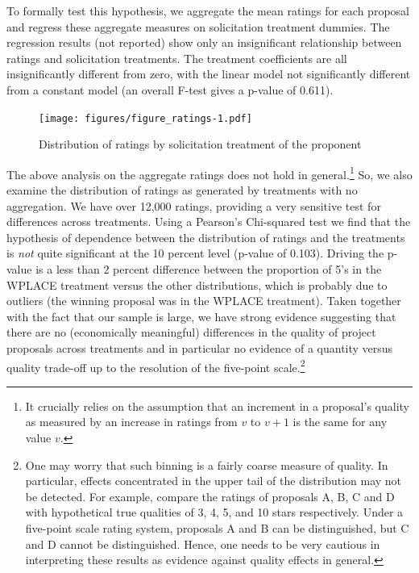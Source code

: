 \documentclass[12pt, titlepage]{article}
\begin{document}
To formally test this hypothesis, we aggregate the mean ratings for each
proposal and regress these aggregate measures on solicitation treatment
dummies. The regression results (not reported) show only an
insignificant relationship between ratings and solicitation treatments.
The treatment coefficients are all insignificantly different from zero,
with the linear model not significantly different from a constant model
(an overall F-test gives a p-value of 0.611).

\begin{figure}
  \centering
  \caption{Distribution of ratings by solicitation treatment of the proponent}
  \label{ratings}
  \texttt{[image: figures/figure\_ratings-1.pdf]}
\end{figure}

The above analysis on the aggregate ratings does not hold in
general.\footnote{It crucially relies on the assumption that an
  increment in a proposal's quality as measured by an increase in
  ratings from \(v\) to \(v+1\) is the same for any value \(v\).} So, we
also examine the distribution of ratings as generated by treatments with
no aggregation. We have over 12,000 ratings, providing a very sensitive
test for differences across treatments. Using a Pearson's Chi-squared
test we find that the hypothesis of dependence between the distribution
of ratings and the treatments is \emph{not} quite significant at the 10
percent level (p-value of 0.103). Driving the p-value is a less than
\(2\) percent difference between the proportion of 5's in the WPLACE
treatment versus the other distributions, which is probably due to
outliers (the winning proposal was in the WPLACE treatment). Taken
together with the fact that our sample is large, we have strong evidence
suggesting that there are no (economically meaningful) differences in
the quality of project proposals across treatments and in particular no
evidence of a quantity versus quality trade-off up to the resolution of
the five-point scale.\footnote{One may worry that such binning is a
  fairly coarse measure of quality. In particular, effects concentrated
  in the upper tail of the distribution may not be detected. For
  example, compare the ratings of proposals A, B, C and D with
  hypothetical true qualities of 3, 4, 5, and 10 stars respectively.
  Under a five-point scale rating system, proposals A and B can be
  distinguished, but C and D cannot be distinguished. Hence, one needs
  to be very cautious in interpreting these results as evidence against
  quality effects in general.}
\end{document}
